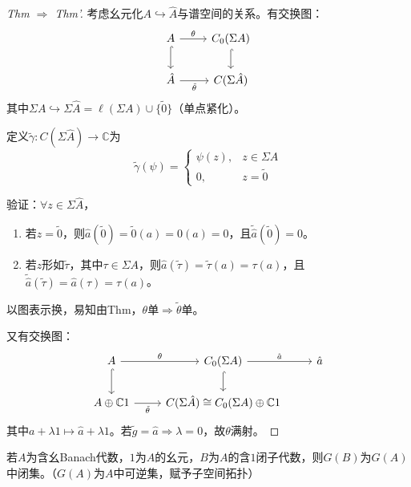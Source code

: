 \documentclass[lang=cn,a4paper,newtx,section]{elegantbook}
\begin{document}
\begin{proof}[Thm $\Rightarrow$ Thm']
  考虑幺元化$A \hookrightarrow \hat{A}$与谱空间的关系。有交换图：
  \begin{equation*}
    \begin{tikzcd}
      A \arrow[r, "\theta"] \arrow[d, hook] & C_0(\Sigma A) \arrow[d, hook] \\
      \hat{A} \arrow[r, "\tilde{\theta}"'] & C(\Sigma\hat{A})
    \end{tikzcd}
  \end{equation*}
  其中$\Sigma A \hookrightarrow \Sigma\hat{A} = \ell(\Sigma A) \cup \{\tilde{0}\}$（单点紧化）。
  
  定义$\tilde{\gamma}: C(\Sigma\hat{A}) \to \mathbb{C}$为
  \begin{equation*}
    \tilde{\gamma}(\psi) = \begin{cases}
      \psi(z), & z \in \Sigma A \\
      0, & z = \tilde{0}
    \end{cases}
  \end{equation*}
  
  验证：$\forall z \in \Sigma\hat{A}$，
  \begin{enumerate}
    \item 若$z = \tilde{0}$，则$\hat{a}(\tilde{0}) = \tilde{0}(a) = 0(a) = 0$，且$\tilde{\hat{a}}(\tilde{0}) = 0$。
    \item 若$z$形如$\tilde{\tau}$，其中$\tau \in \Sigma A$，则$\hat{a}(\tilde{\tau}) = \tilde{\tau}(a) = \tau(a)$，且$\tilde{\hat{a}}(\tilde{\tau}) = \hat{a}(\tau) = \tau(a)$。
  \end{enumerate}
  
  以图表示换，易知由Thm，$\theta$单$\Rightarrow \tilde{\theta}$单。
  
  又有交换图：
  \begin{equation*}
    \begin{tikzcd}
      A \arrow[r, "\theta"] \arrow[d, hook] & C_0(\Sigma A) \arrow[d, hook] \arrow[r, "\hat{a}"] & \hat{a} \\
      A \oplus \mathbb{C}1 \arrow[r, "\tilde{\theta}"'] & C(\Sigma\hat{A}) \cong C_0(\Sigma A) \oplus \mathbb{C}1
    \end{tikzcd}
  \end{equation*}
  其中$a + \lambda 1 \longmapsto \hat{a} + \lambda 1$。若$\tilde{g} = \hat{a} \Rightarrow \lambda = 0$，故$\theta$满射。
\end{proof}

\begin{lemma}\label{lem:GB-closed}
  若$A$为含幺Banach代数，$1$为$A$的幺元，$B$为$A$的含$1$闭子代数，则$G(B)$为$G(A)$中闭集。（$G(A)$为$A$中可逆集，赋予子空间拓扑）
\end{lemma}
\end{document}
